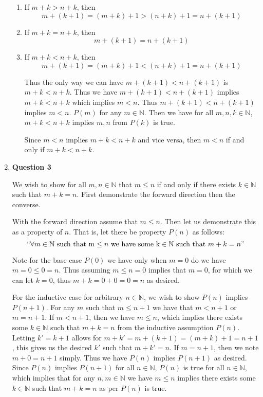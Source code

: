\documentclass{article}
\begin{document}
\begin{enumerate}
		\begin{enumerate}
		\item 
		\medskip
		If $m + k > n + k$, then $$m + (k + 1) = (m + k) + 1 > (n + k) + 1 = n + (k + 1)$$
		
		\item 
		\medskip
		If $m + k = n + k$, then $$m + (k + 1) = n + (k + 1)$$
		
		\item 
		\medskip
		If $m + k < n + k$, then $$m + (k + 1) = (m + k) + 1 < (n + k) + 1 = n + (k + 1)$$
		
		\medskip
		Thus the only way we can have $m + (k + 1) < n + (k + 1)$ is $m + k < n + k$. Thus we have $m + (k + 1) < n + (k + 1)$ implies $m + k < n + k$ which implies $m < n$. Thus $m + (k + 1) < n + (k + 1)$ implies $m < n$. $P(m)$ for any $m \in \mathbb{N}$. Then we have for all $m,n,k \in \mathbb{N}$, $m + k < n + k$ implies $m, n$ from $P(k)$ is true.
		
		\medskip
		
		Since $m < n$ implies $m + k < n + k$ and vice versa, then $m < n$ if and only if $m + k < n + k$.
		 
		\end{enumerate}
		
		\medskip
		\item \textbf{Question 3}
		\medskip
		
		We wish to show for all $m,n \in \mathbb{N}$ that $m \leq n$ if and only if there exists $k \in \mathbb{N}$ such that $m + k = n$. First demonstrate the forward direction then the converse.
		
		\medskip
		With the forward direction assume that $m \leq n$. Then let us demonstrate this as a property of $n$. That is, let there be property $P(n)$ as follows: $$``\forall m \in \mathbb{N} \text{ such that m} \leq n \text{ we have some k} \in \mathbb{N} \text{ such that } m + k = n\text{''}$$
		
		Note for the base case $P(0)$ we have only when $m = 0$ do we have $m = 0 \leq 0 = n$. Thus assuming $m \leq n = 0$ implies that $m = 0$, for which we can let $k = 0$, thus $m + k = 0 + 0 = 0 = n$ as desired.
		 
		\medskip
		For the inductive case for arbitrary $n \in \mathbb{N}$, we wish to show $P(n)$ implies $P(n + 1)$. For any $m$ such that $m \leq n + 1$ we have that $m < n + 1$ or $m = n + 1$. If $m < n + 1$, then we have $m \leq n$, which implies there exists some $k \in \mathbb{N}$ such that $m + k = n$ from the inductive assumption $P(n)$. Letting $k' = k + 1$ allows for $m + k' = m + (k + 1) = (m + k) + 1 = n + 1$, this gives us the desired $k'$ such that $m + k' = n$. If $m = n + 1$, then we note $m + 0 = n + 1$ simply. Thus we have $P(n)$ implies $P(n + 1)$ as desired. Since $P(n)$ implies $P(n + 1)$ for all $n \in \mathbb{N}$, $P(n)$ is true for all $n \in \mathbb{N}$, which implies that for any $n,m \in \mathbb{N}$ we have $m \leq n$ implies there exists some $k \in \mathbb{N}$ such that $m + k = n$ as per $P(n)$ is true.
		

\end{enumerate}
\end{document}
